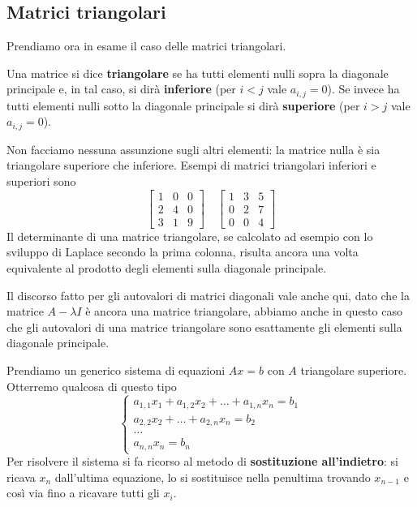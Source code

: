 \subsection{Matrici triangolari}
Prendiamo ora in esame il caso delle matrici triangolari.

\begin{definition}
	Una matrice si dice \textbf{triangolare} se ha tutti elementi nulli sopra la diagonale principale e, in
	tal caso, si dirà \textbf{inferiore} (per $i < j$ vale $a_{i,j} = 0$). Se invece ha tutti elementi nulli
	sotto la diagonale principale si dirà \textbf{superiore} (per $i > j$ vale $a_{i,j} = 0$).
\end{definition}

Non facciamo nessuna assunzione sugli altri elementi: la matrice nulla è sia triangolare superiore che inferiore.
Esempi di matrici triangolari inferiori e superiori sono
\[
	\begin{bmatrix}
		1 & 0 & 0 \\
		2 & 4 & 0 \\
		3 & 1 & 9
	\end{bmatrix} \quad
	\begin{bmatrix}
		1 & 3 & 5 \\
		0 & 2 & 7 \\
		0 & 0 & 4
	\end{bmatrix}
\]
Il determinante di una matrice triangolare, se calcolato ad esempio con lo sviluppo di Laplace secondo la prima
colonna, risulta ancora una volta equivalente al prodotto degli elementi sulla diagonale principale.

Il discorso fatto per gli autovalori di matrici diagonali vale anche qui, dato che la matrice $A - \lambda I$ è
ancora una matrice triangolare, abbiamo anche in questo caso che gli autovalori di una matrice triangolare sono
esattamente gli elementi sulla diagonale principale.

Prendiamo un generico sistema di equazioni $A x = b$ con $A$ triangolare superiore. Otterremo qualcosa di questo
tipo
\[
	\begin{cases}
		a_{1,1} x_1 + a_{1,2} x_2 + \dots + a_{1,n} x_n = b_1 \\
		a_{2,2} x_2 + \dots + a_{2,n} x_n = b_2               \\
		\dots                                                 \\
		a_{n,n} x_n = b_n
	\end{cases}
\]
Per risolvere il sistema si fa ricorso al metodo di \textbf{sostituzione all'indietro}: si ricava $x_n$
dall'ultima equazione, lo si sostituisce nella penultima trovando $x_{n-1}$ e così via fino a ricavare tutti gli
$x_i$.

